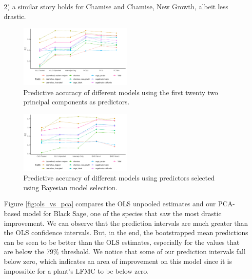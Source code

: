 \documentclass[twocolumn,10pt]{article}
\begin{document}
\ref{fig:BMS_R2}) a similar story holds for Chamise and Chamise, New Growth, albeit less drastic. \\

\begin{figure}
    \centering
    \includegraphics[width=0.5\textwidth,scale=0.9]{figures/lmer_pca/PCA_R2.png}
    \caption{Predictive accuracy of different models using the first twenty two principal components as predictors.}
    \label{fig:PCA_R2}
\end{figure}

\begin{figure}
    \centering
    \includegraphics[width=0.5\textwidth, scale=0.9]{figures/lmer_BMS/bms_R2.png}
    \caption{Predictive accuracy of different models using predictors selected using Bayesian model selection.}
    \label{fig:BMS_R2}
\end{figure}
Figure \ref{fig:ols_vs_pca} compares the OLS unpooled estimates and our PCA-based model for Black Sage, one of the species that saw the most drastic improvement. We can observe that the prediction intervals are much greater than the OLS confidence intervals. But, in the end, the bootstrapped mean predictions can be seen to be better than the OLS estimates, especially for the values that are below the 79\% threshold. We notice that some of our prediction intervals fall below zero, which indicates an area of improvement on this model since it is impossible for a plant's LFMC to be below zero.  \\
\end{document}
